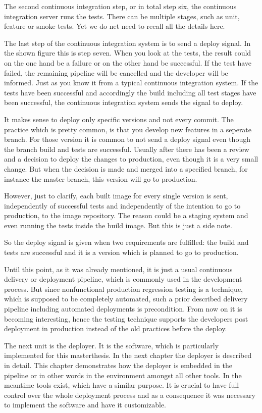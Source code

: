 The second continuous integration step, or in total step six, the continuous integration server runs the tests. There can be multiple stages, such as unit, feature or smoke tests. Yet we do net need to recall all the details here.

The last step of the continuous integration system is to send a deploy signal. In the shown figure this is step seven. When you look at the tests, the result could on the one hand be a failure or on the other hand be successful. If the test have failed, the remaining pipeline will be cancelled and the developer will be informed. Just as you know it from a typical continuous integration system. If the tests have been successful and accordingly the build including all test stages have been successful, the continuous integration system sends the signal to deploy.

It makes sense to deploy only specific versions and not every commit. The practice which is pretty common, is that you develop new features in a seperate branch. For those version it is common to not send a deploy signal even though the branch build and tests are successful. Usually after there has been a review and a decision to deploy the changes to production, even though it is a very small change. But when the decision is made and merged into a specified branch, for instance the master branch, this version will go to production.

However, just to clarify, each built image for every single version is sent, independently of successful tests and independently of the intention to go to production, to the image repository. The reason could be a staging system and even running the tests inside the build image. But this is just a side note.

So the deploy signal is given when two requirements are fulfilled: the build and tests are successful and it is a version which is planned to go to production.

Until this point, as it was already mentioned, it is just a usual continuous delivery or deployment pipeline, which is commonly used in the development process. But since nonfunctional production regression testing is a technique, which is supposed to be completely automated, such a prior described delivery pipeline including automated deployments is precondition. From now on it is becoming interesting, hence the testing technique supports the developers post deployment in production instead of the old practices before the deploy.

The next unit is the deployer. It is the software, which is particularly implemented for this masterthesis. In the next chapter the deployer is described in detail. This chapter demonstrates how the deployer is embedded in the pipeline or in other words in the environment amongst all other tools. In the meantime tools exist, which have a similar purpose. It is crucial to have full control over the whole deployment process and as a consequence it was necessary to implement the software and have it customizable.


